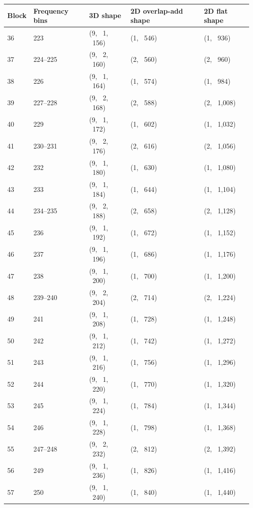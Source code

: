 \documentclass[report.tex]{subfiles}
\begin{document}
\begin{table}[ht]
	\centering
	\begin{tabular}{ |l|l|l|l|l| }
	 \hline
		Block & Frequency bins & 3D shape & 2D overlap-add shape & 2D flat shape \\
	 \hline
	 \hline
\hline
36 & 223 & (9, \ 1, \ 156) & (1, \ 546) & (1, \ 936) \\
\hline
37 & 224--225 & (9, \ 2, \ 160) & (2, \ 560) & (2, \ 960) \\
\hline
38 & 226 & (9, \ 1, \ 164) & (1, \ 574) & (1, \ 984) \\
\hline
39 & 227--228 & (9, \ 2, \ 168) & (2, \ 588) & (2, \ 1,008) \\
\hline
40 & 229 & (9, \ 1, \ 172) & (1, \ 602) & (1, \ 1,032) \\
\hline
41 & 230--231 & (9, \ 2, \ 176) & (2, \ 616) & (2, \ 1,056) \\
\hline
42 & 232 & (9, \ 1, \ 180) & (1, \ 630) & (1, \ 1,080) \\
\hline
43 & 233 & (9, \ 1, \ 184) & (1, \ 644) & (1, \ 1,104) \\
\hline
44 & 234--235 & (9, \ 2, \ 188) & (2, \ 658) & (2, \ 1,128) \\
\hline
45 & 236 & (9, \ 1, \ 192) & (1, \ 672) & (1, \ 1,152) \\
\hline
46 & 237 & (9, \ 1, \ 196) & (1, \ 686) & (1, \ 1,176) \\
\hline
47 & 238 & (9, \ 1, \ 200) & (1, \ 700) & (1, \ 1,200) \\
\hline
48 & 239--240 & (9, \ 2, \ 204) & (2, \ 714) & (2, \ 1,224) \\
\hline
49 & 241 & (9, \ 1, \ 208) & (1, \ 728) & (1, \ 1,248) \\
\hline
50 & 242 & (9, \ 1, \ 212) & (1, \ 742) & (1, \ 1,272) \\
\hline
51 & 243 & (9, \ 1, \ 216) & (1, \ 756) & (1, \ 1,296) \\
\hline
52 & 244 & (9, \ 1, \ 220) & (1, \ 770) & (1, \ 1,320) \\
\hline
53 & 245 & (9, \ 1, \ 224) & (1, \ 784) & (1, \ 1,344) \\
\hline
54 & 246 & (9, \ 1, \ 228) & (1, \ 798) & (1, \ 1,368) \\
\hline
55 & 247--248 & (9, \ 2, \ 232) & (2, \ 812) & (2, \ 1,392) \\
\hline
56 & 249 & (9, \ 1, \ 236) & (1, \ 826) & (1, \ 1,416) \\
\hline
57 & 250 & (9, \ 1, \ 240) & (1, \ 840) & (1, \ 1,440) \\

\end{tabular}
\end{table}
\end{document}
